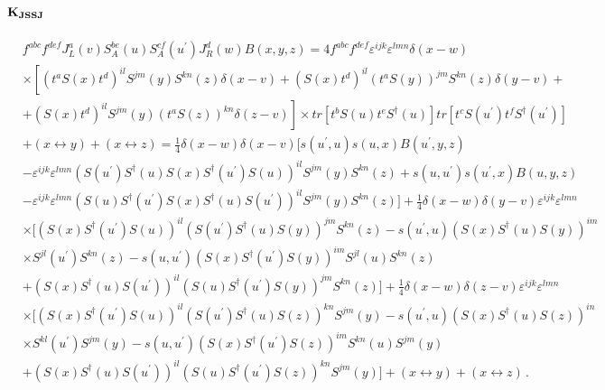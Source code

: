 \documentclass[11pt,a4paper]{article}
\begin{document}
\subsection*{$\bf K_{JSSJ}$}
\begin{equation}\begin{split}
&f^{abc}f^{def}J_{L}^{a}(v)S_A^{be}(u)S_A^{cf}(u^{\prime})J_{R}^{d}(w)B(x,y,z)=4f^{abc}f^{def}\varepsilon^{ijk}\varepsilon^{lmn}\delta(x-w)\\
&\times \left[(t^{a}S(x)t^{d})^{il}S^{jm}(y)S^{kn}(z)\delta(x-v)+(S(x)t^{d})^{il}(t^{a}S(y))^{jm}S^{kn}(z)\delta(y-v)+\right.\\
&\left.+(S(x)t^{d})^{il}S^{jm}(y)(t^{a}S(z))^{kn}\delta(z-v)\right]\times tr\left[t^{b}S(u)t^{e}S^{\dagger}(u)\right]tr\left[t^{c}S(u^{\prime})t^{f}S^{\dagger}(u^{\prime})\right] \\
&+(x\leftrightarrow y)+(x\leftrightarrow z)=\frac{1}{4}\delta(x-w)\delta(x-v)\Big[s(u^{\prime},u)s(u,x)B(u^{\prime},y,z)\\
&-\varepsilon^{ijk}\varepsilon^{lmn}\left(S(u^{\prime})S^{\dagger}(u)S(x)S^{\dagger}(u^{\prime})S(u)\right)^{il}S^{jm}(y)S^{kn}(z)
+s(u,u^{\prime})s(u^{\prime},x)B(u,y,z)\\
&-\varepsilon^{ijk}\varepsilon^{lmn}\left(S(u)S^{\dagger}(u^{\prime})S(x)S^{\dagger}(u)S(u^{\prime})\right)^{il}S^{jm}(y)S^{kn}(z)\Big] 
+\frac{1}{4}\delta(x-w)\delta(y-v)\varepsilon^{ijk}\varepsilon^{lmn}\\
&\times\Big[\left(S(x)S^{\dagger}(u^{\prime})S(u)\right)^{il}(S(u^{\prime})S^{\dagger}(u)S(y))^{jm}S^{kn}(z)-s(u^{\prime},u)\left(S(x)S^{\dagger}(u)S(y)\right)^{im}\\
&\times S^{jl}(u^{\prime})S^{kn}(z)-s(u,u^{\prime})\left(S(x)S^{\dagger}(u^{\prime})S(y)\right)^{im}S^{jl}(u)S^{kn}(z)\\
&+\left(S(x)S^{\dagger}(u)S(u^{\prime})\right)^{il}\left(S(u)S^{\dagger}(u^{\prime})S(y)\right)^{jm}S^{kn}(z)\Big]+\frac{1}{4}\delta(x-w)\delta(z-v)\varepsilon^{ijk}\varepsilon^{lmn}\\
&\times \Big[\left(S(x)S^{\dagger}(u^{\prime})S(u)\right)^{il}(S(u^{\prime})S^{\dagger}(u)S(z))^{kn}S^{jm}(y)-s(u^{\prime},u)\left(S(x)S^{\dagger}(u)S(z)\right)^{in}\\
&\times S^{kl}(u^{\prime})S^{jm}(y)-s(u,u^{\prime})\left(S(x)S^{\dagger}(u^{\prime})S(z)\right)^{im}S^{kn}(u)S^{jm}(y)\\
&+\left(S(x)S^{\dagger}(u)S(u^{\prime})\right)^{il}\left(S(u)S^{\dagger}(u^{\prime})S(z)\right)^{kn}S^{jm}(y)\Big]+(x\leftrightarrow y)+(x\leftrightarrow z)\,. \\
\end{split}\end{equation}
\end{document}

